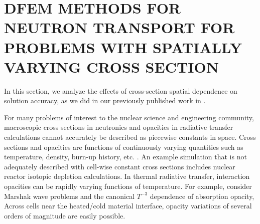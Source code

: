 %
%
%



\chapter{\uppercase{DFEM Methods for Neutron Transport for Problems with Spatially Varying Cross Section}}
\label{sec:chapter3_variable_xs}

In this section, we analyze the effects of cross-section spatial dependence on solution accuracy, as we did in our previously published work in \cite{part_2_paper}.

For many problems of interest to the nuclear science and engineering community, macroscopic cross sections in neutronics and opacities in radiative transfer calculations cannot accurately be described as piecewise constants in space.  
Cross sections and opacities are functions of continuously varying quantities such as temperature, density, burn-up history, etc. \cite{xs_are_T_dependent}.
An example simulation that is not adequately described with cell-wise constant cross sections includes nuclear reactor isotopic depletion calculations.
In thermal radiative transfer, interaction opacities can be rapidly varying functions of temperature.  
For example, consider Marshak wave problems and the canonical $T^{-3}$ dependence \cite{ober_shadid} of absorption opacity, 
Across cells near the heated/cold material interface, opacity variations of several orders of magnitude are easily possible.


